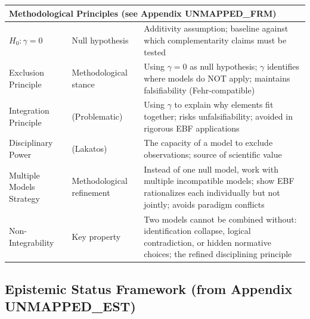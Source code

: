 \begin{center}
\begin{longtable}{@{}lp{3cm}p{8cm}@{}}
\multicolumn{3}{l}{\textbf{Methodological Principles (see Appendix UNMAPPED_FRM)}} \\
\midrule
$H_0: \gamma = 0$ & Null hypothesis & Additivity assumption; baseline against which complementarity claims must be tested \\
Exclusion Principle & Methodological stance & Using $\gamma = 0$ as null hypothesis; $\gamma$ identifies where models do NOT apply; maintains falsifiability (Fehr-compatible) \\
Integration Principle & (Problematic) & Using $\gamma$ to explain why elements fit together; risks unfalsifiability; avoided in rigorous EBF applications \\
Disciplinary Power & (Lakatos) & The capacity of a model to exclude observations; source of scientific value \\
Multiple Models Strategy & Methodological refinement & Instead of one null model, work with multiple incompatible models; show EBF rationalizes each individually but not jointly; avoids paradigm conflicts \\
Non-Integrability & Key property & Two models cannot be combined without: identification collapse, logical contradiction, or hidden normative choices; the refined disciplining principle \\
\bottomrule
\end{longtable}
\end{center}

\subsection{Epistemic Status Framework (from Appendix UNMAPPED_EST)}
\label{sec:glossary-epistemic}

